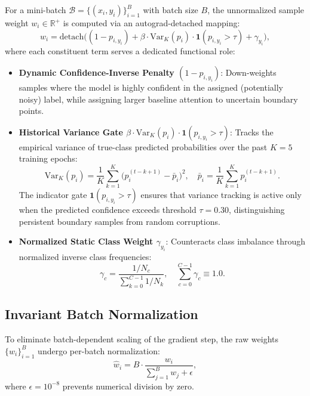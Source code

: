 \documentclass[preprint,12pt]{elsarticle}
\newcommand{\indicator}{\mathbf{1}}
\begin{document}
For a mini-batch $\mathcal{B} = \{(x_i, y_i)\}_{i=1}^B$ with batch size $B$, the unnormalized sample weight $w_i \in \mathbb{R}^+$ is computed via an autograd-detached mapping:
\begin{equation}
\label{eq:raw_weight}
w_i = \mathrm{detach}\Big( (1 - p_{i, y_i}) + \beta \cdot \mathrm{Var}_K(p_i) \cdot \indicator(p_{i, y_i} > \tau) + \gamma_{y_i} \Big),
\end{equation}
where each constituent term serves a dedicated functional role:
\begin{itemize}
    \item \textbf{Dynamic Confidence-Inverse Penalty $(1 - p_{i, y_i})$}: Down-weights samples where the model is highly confident in the assigned (potentially noisy) label, while assigning larger baseline attention to uncertain boundary points.
    \item \textbf{Historical Variance Gate $\beta \cdot \mathrm{Var}_K(p_i) \cdot \indicator(p_{i, y_i} > \tau)$}: Tracks the empirical variance of true-class predicted probabilities over the past $K=5$ training epochs:
    \begin{equation}
    \mathrm{Var}_K(p_i) = \frac{1}{K}\sum_{k=1}^K \Big( p_i^{(t-k+1)} - \bar{p}_i \Big)^2, \quad \bar{p}_i = \frac{1}{K}\sum_{k=1}^K p_i^{(t-k+1)}.
    \end{equation}
    The indicator gate $\indicator(p_{i, y_i} > \tau)$ ensures that variance tracking is active only when the predicted confidence exceeds threshold $\tau=0.30$, distinguishing persistent boundary samples from random corruptions.
    \item \textbf{Normalized Static Class Weight $\gamma_{y_i}$}: Counteracts class imbalance through normalized inverse class frequencies:
    \begin{equation}
    \gamma_c = \frac{1 / N_c}{\sum_{k=0}^{C-1} 1 / N_k}, \quad \sum_{c=0}^{C-1} \gamma_c \equiv 1.0.
    \end{equation}
\end{itemize}

\subsection{Invariant Batch Normalization}

To eliminate batch-dependent scaling of the gradient step, the raw weights $\{w_i\}_{i=1}^B$ undergo per-batch normalization:
\begin{equation}
\label{eq:batch_norm}
\hat{w}_i = B \cdot \frac{w_i}{\sum_{j=1}^B w_j + \epsilon},
\end{equation}
where $\epsilon = 10^{-8}$ prevents numerical division by zero.
\end{document}
